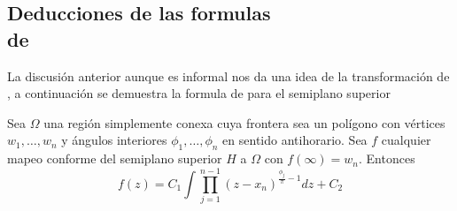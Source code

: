 	\subsection{Deducciones de las formulas \\de \SC}
	La discusión anterior aunque es informal nos da una idea de la transformación de \SC, a continuación se demuestra la formula de \SC para el semiplano superior
	\begin{teor}
		Sea $\Omega$ una región simplemente conexa cuya frontera sea un polígono con vértices $w_1,\ldots,w_n$ y ángulos interiores $\phi_1, \ldots,\phi_n $ en sentido antihorario. Sea $f$ cualquier mapeo conforme del semiplano superior $H$ a $\Omega$ con $f (\infty) = w_n$. Entonces
		\begin{equation}\label{SCSP}
			f(z)=C_1\int \prod_{j=1}^{n-1}(z-x_n)^{\frac{\phi_j}{\pi}-1} dz +C_2
		\end{equation}
		

\end{teor}
